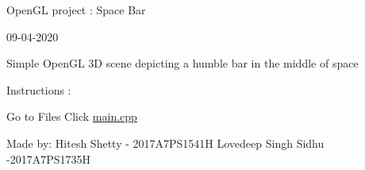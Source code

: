 Open\+GL project \+: Space Bar

09-\/04-\/2020

Simple Open\+GL 3D scene depicting a humble bar in the middle of space

Instructions \+:

Go to Files Click \mbox{\hyperlink{main_8cpp}{main.\+cpp}}

Made by\+: Hitesh Shetty -\/ 2017A7\+P\+S1541H Lovedeep Singh Sidhu -\/2017A7\+P\+S1735H 